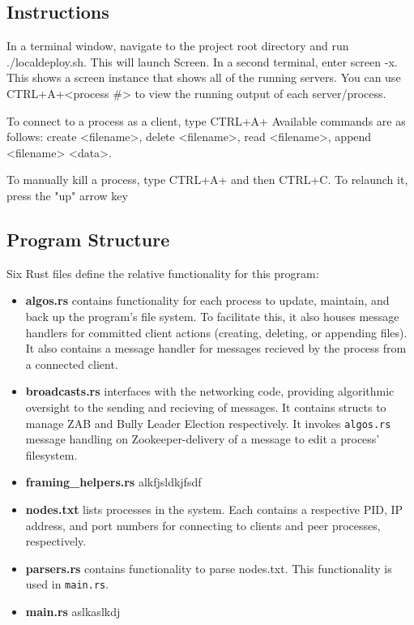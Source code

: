 \documentclass{article}
\begin{document}
%
%
%
\subsection*{Instructions}
    In a terminal window, navigate to the project root directory and run ./localdeploy.sh. This will launch  Screen. In a second terminal, enter screen -x. This shows a screen instance that shows all of the running servers. You can use CTRL+A+<process #> to view the running output of each server/process. 

    To connect to a process as a client, type CTRL+A+ Available commands are as follows: create <filename>, delete <filename>, read <filename>, append <filename> <data>.

    To manually kill a process, type CTRL+A+ and then CTRL+C. To relaunch it, press the "up" arrow key 

\subsection*{Program Structure}
    Six Rust files define the relative functionality for this program:
	\begin{itemize}
	        \item\textbf{algos.rs} contains functionality for each process to update, maintain, and back up the program's file system. To facilitate this, it also houses message handlers for committed client actions (creating, deleting, or appending files). It also contains a message handler for messages recieved by the process from a connected client.
	        \item\textbf{broadcasts.rs} interfaces with the networking code, providing algorithmic oversight to the sending and recieving of messages. It contains structs to manage ZAB and Bully Leader Election respectively. It invokes \verb|algos.rs| message handling on Zookeeper-delivery of a message to edit a process' filesystem.
	        \item\textbf{framing\_helpers.rs} alkfjsldkjfsdf
	        \item\textbf{nodes.txt} lists processes in the system. Each contains a respective PID, IP address, and port numbers for connecting to clients and peer processes, respectively.
	        \item\textbf{parsers.rs} contains functionality to parse nodes.txt. This functionality is used in \verb|main.rs|.
	        \item\textbf{main.rs} aslkaslkdj
	\end{itemize}
\end{document}
